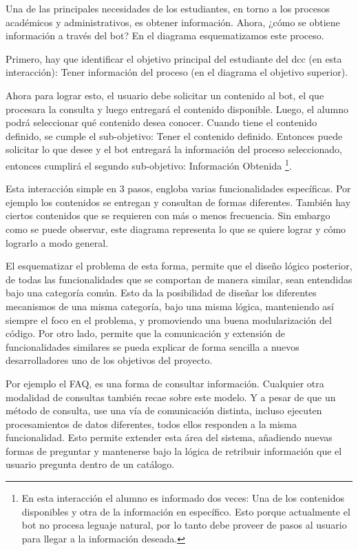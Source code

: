         \par Una de las principales necesidades de los estudiantes, en torno a los procesos académicos y administrativos, es obtener información. Ahora, ¿cómo se obtiene información a través del bot? En el diagrama esquematizamos este proceso.
        \par Primero, hay que identificar el objetivo principal del estudiante del dcc (en esta interacción): Tener información del proceso (en el diagrama el objetivo superior). 
        \par Ahora para lograr esto, el usuario debe solicitar un contenido al bot, el que procesara la consulta y luego entregará el contenido disponible. Luego, el alumno podrá seleccionar qué contenido desea conocer. Cuando tiene el contenido definido, se cumple el sub-objetivo: Tener el contenido definido. Entonces puede solicitar lo que desee y el bot entregará la información del proceso seleccionado, entonces cumplirá el segundo sub-objetivo: Información Obtenida \footnote{En esta interacción el alumno es informado dos veces: Una de los contenidos disponibles y otra de la información en específico. Esto porque actualmente el bot no procesa leguaje natural, por lo tanto debe proveer de pasos al usuario para llegar a la información deseada.}. 
        \par Esta interacción simple en 3 pasos, engloba varias funcionalidades específicas. Por ejemplo los contenidos se entregan y consultan de formas diferentes. También hay ciertos contenidos que se requieren con más o menos frecuencia. Sin embargo como se puede observar, este diagrama representa lo que se quiere lograr y cómo lograrlo a modo general.
        \par El esquematizar el problema de esta forma, permite que el diseño lógico posterior, de todas las funcionalidades que se comportan de manera similar, sean entendidas bajo una categoría común. Esto da la posibilidad de diseñar los diferentes mecanismos de una misma categoría, bajo una misma lógica, manteniendo así siempre el foco en el problema, y promoviendo una buena modularización del código. Por otro lado, permite que la comunicación y extensión de funcionalidades similares se pueda explicar de forma sencilla a nuevos desarrolladores uno de los objetivos del proyecto. 
        \par Por ejemplo el FAQ, es una forma de consultar información. Cualquier otra modalidad de consultas también recae sobre este modelo. Y a pesar de que un método de consulta, use una vía de comunicación distinta, incluso ejecuten procesamientos de datos diferentes, todos ellos responden a la misma funcionalidad. Esto permite extender esta área del sistema, añadiendo nuevas formas de preguntar y mantenerse bajo la lógica de retribuir información que el usuario pregunta dentro de un catálogo.
    
